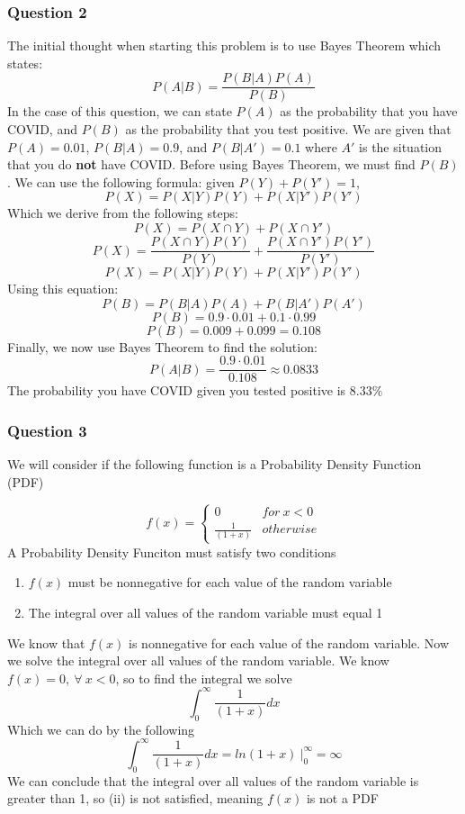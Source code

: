 \documentclass{article}
\begin{document}
\subsubsection*{Question 2}
The initial thought when starting this problem is to use Bayes Theorem which states:
\begin{equation}
  \label{eq:bayes}
  P(A|B) = \frac{P(B | A) P(A)}{P(B)}
\end{equation}
In the case of this question, we can state $P(A)$ as the probability that you have COVID, and
$P(B)$ as the probability that you test positive. We are given that $P(A) = 0.01$, $P(B|A) = 0.9$, and $P(B|A') = 0.1$
where $A'$ is the situation that you do \textbf{not} have COVID. Before using Bayes Theorem, we must find $P(B)$.
We can use the following formula: 
\newline
given $P(Y) + P(Y') = 1$,
\begin{equation}
  P(X) = P(X | Y)P(Y) + P(X | Y')P(Y')
\end{equation}
Which we derive from the following steps:
\[P(X) = P(X \cap Y) + P(X \cap Y')\]
\[P(X) = \frac{P(X \cap Y)P(Y)}{P(Y)} + \frac{P(X \cap Y')P(Y')}{P(Y')}\]
\[P(X) = P(X | Y)P(Y) + P(X | Y')P(Y')\]
Using this equation:
\[P(B) = P(B|A)P(A) + P(B|A')P(A')\]
\[P(B) = 0.9\cdot 0.01 + 0.1 \cdot 0.99\]
\[P(B) = 0.009 + 0.099 = 0.108\]
Finally, we now use Bayes Theorem to find the solution:
\[P(A|B) = \frac{0.9\cdot 0.01}{0.108} \approx 0.0833\]
The probability you have COVID given you tested positive is $8.33\%$

\subsubsection*{Question 3}
We will consider if the following function is a Probability Density Function (PDF)

\begin{equation}
  f(x) = \left\{
  \begin{array}{cl}
    0 & for \ x < 0\\
    \frac{1}{(1+x)}  & otherwise
  \end{array}
  \right.
\end{equation}
A Probability Density Funciton must satisfy two conditions
\begin{enumerate}[label=(\roman*)]
  \item $f(x)$ must be nonnegative for each value of the random variable
  \item The integral over all values of the random variable must equal 1
\end{enumerate}
We know that $f(x)$ is nonnegative for each value of the random variable. 
Now we solve the integral over all values of the random variable. We know 
$f(x) = 0, \ \forall \ x < 0$, so to find the integral we solve
\begin{equation}
  \int_{0}^{\infty}{\frac{1}{(1+x)}dx}
\end{equation}
Which we can do by the following
\[\int_{0}^{\infty}\frac{1}{(1+x)}dx = ln(1+x) \ \bigg|_{0}^{\infty} = \infty\]
We can conclude that the integral over all values of the random variable is greater than 1, so (ii) is not satisfied,
meaning $f(x)$ is not a PDF
\end{document}
